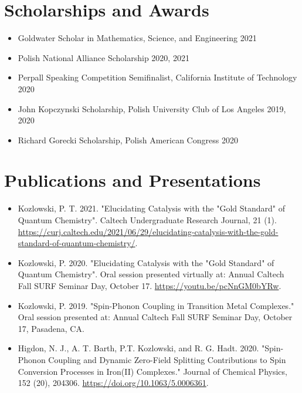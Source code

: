 \documentclass[margin,line]{resume}
\begin{document}
\begin{resume}
\section{\mysidestyle Scholarships and Awards}
\begin{itemize}
    \item  \textnormal{Goldwater Scholar in Mathematics, Science, and Engineering} \hfill 2021
    \item \textnormal{Polish National Alliance Scholarship} \hfill 2020, 2021
    \item \textnormal{Perpall Speaking Competition Semifinalist, California Institute of Technology} \hfill 2020
    \item \textnormal{John Kopczynski Scholarship, Polish University Club of Los Angeles} \hfill 2019, 2020
    \item \textnormal{Richard Gorecki Scholarship, Polish American Congress} \hfill 2020
\end{itemize}

\section{\mysidestyle Publications and Presentations}
\begin{itemize}
    \item Kozlowski, P. T. 2021. "Elucidating Catalysis with the "Gold Standard" of Quantum Chemistry". Caltech Undergraduate Research Journal, 21 (1). \url{https://curj.caltech.edu/2021/06/29/elucidating-catalysis-with-the-gold-standard-of-quantum-chemistry/}.
    \item Kozlowski, P. 2020. "Elucidating Catalysis with the "Gold Standard" of Quantum Chemistry". Oral session presented virtually at: Annual Caltech Fall SURF Seminar Day, October 17. \url{https://youtu.be/pcNnGM0bYRw}.
    \item Kozlowski, P. 2019. "Spin-Phonon Coupling in Transition Metal Complexes." Oral session presented at: Annual Caltech Fall SURF Seminar Day, October 17, Pasadena, CA.
    \item Higdon, N. J., A. T. Barth, P.T. Kozlowski, and R. G. Hadt. 2020. "Spin-Phonon Coupling and Dynamic Zero-Field Splitting Contributions to Spin Conversion Processes in Iron(II) Complexes." Journal of Chemical Physics, 152 (20), 204306. \url{https://doi.org/10.1063/5.0006361}.
\end{itemize}
\newpage

\end{resume}
\end{document}
